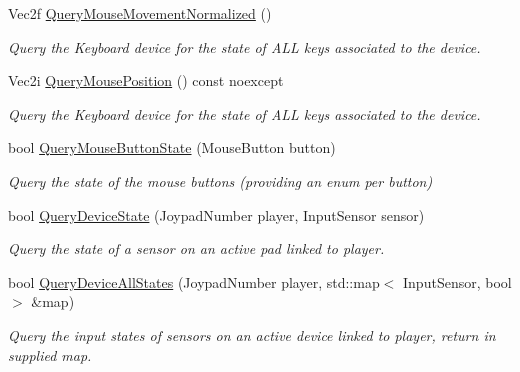 \begin{DoxyCompactItemize}
Vec2f \hyperlink{class_blade_1_1_input_manager_aa96a587de7ed5234b2b7883df48c0a09}{Query\+Mouse\+Movement\+Normalized} ()
\begin{DoxyCompactList}\small\item\em Query the Keyboard device for the state of A\+LL keys associated to the device. \end{DoxyCompactList}\item 
Vec2i \hyperlink{class_blade_1_1_input_manager_a0bd64dfa38174d3fa87c445ee261d8c3}{Query\+Mouse\+Position} () const noexcept
\begin{DoxyCompactList}\small\item\em Query the Keyboard device for the state of A\+LL keys associated to the device. \end{DoxyCompactList}\item 
bool \hyperlink{class_blade_1_1_input_manager_ad2537487a4c3c80e7eb6b8c0ea37b09b}{Query\+Mouse\+Button\+State} (Mouse\+Button button)
\begin{DoxyCompactList}\small\item\em Query the state of the mouse buttons (providing an enum per button) \end{DoxyCompactList}\item 
\mbox{\label{class_blade_1_1_input_manager_a94dc87364eb3e84cbe56906e483c2b5b}} 
bool \hyperlink{class_blade_1_1_input_manager_a94dc87364eb3e84cbe56906e483c2b5b}{Query\+Device\+State} (Joypad\+Number player, Input\+Sensor sensor)
\begin{DoxyCompactList}\small\item\em Query the state of a sensor on an active pad linked to player. \end{DoxyCompactList}\item 
\mbox{\label{class_blade_1_1_input_manager_aefed17ef43650b20e93f23e5e08c8e89}} 
bool \hyperlink{class_blade_1_1_input_manager_aefed17ef43650b20e93f23e5e08c8e89}{Query\+Device\+All\+States} (Joypad\+Number player, std\+::map$<$ Input\+Sensor, bool $>$ \&map)
\begin{DoxyCompactList}\small\item\em Query the input states of sensors on an active device linked to player, return in supplied map. \end{DoxyCompactList}\item 
\mbox{\label{class_blade_1_1_input_manager_a1184a42c2c6b0f96d4169936090f9480}} 

\end{DoxyCompactItemize}
